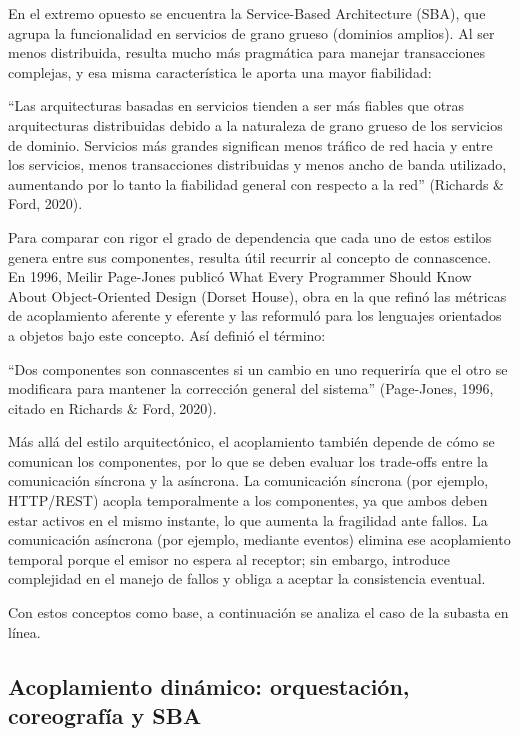 \documentclass[12pt, a4paper]{article}
\begin{document}
    En el extremo opuesto se encuentra la Service-Based Architecture (SBA), que agrupa la funcionalidad en servicios de grano grueso (dominios amplios). Al ser menos distribuida, resulta mucho más pragmática para manejar transacciones complejas, y esa misma característica le aporta una mayor fiabilidad:

    “Las arquitecturas basadas en servicios tienden a ser más fiables que otras arquitecturas distribuidas debido a la naturaleza de grano grueso de los servicios de dominio. Servicios más grandes significan menos tráfico de red hacia y entre los servicios, menos transacciones distribuidas y menos ancho de banda utilizado, aumentando por lo tanto la fiabilidad general con respecto a la red” (Richards \& Ford, 2020).

    Para comparar con rigor el grado de dependencia que cada uno de estos estilos genera entre sus componentes, resulta útil recurrir al concepto de connascence. En 1996, Meilir Page-Jones publicó What Every Programmer Should Know About Object-Oriented Design (Dorset House), obra en la que refinó las métricas de acoplamiento aferente y eferente y las reformuló para los lenguajes orientados a objetos bajo este concepto. Así definió el término:

    “Dos componentes son connascentes si un cambio en uno requeriría que el otro se modificara para mantener la corrección general del sistema” (Page-Jones, 1996, citado en Richards \& Ford, 2020).

    Más allá del estilo arquitectónico, el acoplamiento también depende de cómo se comunican los componentes, por lo que se deben evaluar los trade-offs entre la comunicación síncrona y la asíncrona. La comunicación síncrona (por ejemplo, HTTP/REST) acopla temporalmente a los componentes, ya que ambos deben estar activos en el mismo instante, lo que aumenta la fragilidad ante fallos. La comunicación asíncrona (por ejemplo, mediante eventos) elimina ese acoplamiento temporal porque el emisor no espera al receptor; sin embargo, introduce complejidad en el manejo de fallos y obliga a aceptar la consistencia eventual.

    Con estos conceptos como base, a continuación se analiza el caso de la subasta en línea.

    \subsection{Acoplamiento dinámico: orquestación, coreografía y SBA}
\end{document}
